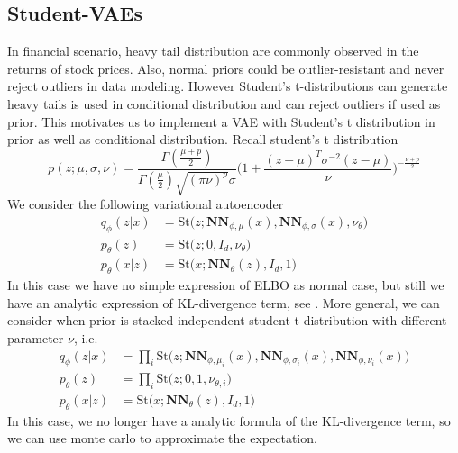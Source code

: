 \documentclass[12pt]{report}
\theoremstyle{definition}
\theoremstyle{remark}
\begin{document}
\subsection{Student-VAEs}
In financial scenario, heavy tail distribution are commonly observed in the returns of stock prices. Also, normal priors could be outlier-resistant and never reject outliers in data modeling. However Student’s t-distributions can generate heavy tails is used in conditional distribution and can reject outliers if used as prior. This motivates us to implement a VAE with Student’s t distribution in prior \cite{abiri2020variational} as well as conditional distribution. Recall student's t distribution 
\begin{equation}
  p(z;\mu,\sigma,\nu) = \frac{\Gamma(\frac{\mu + p}{2})}{\Gamma(\frac{\mu}{2})\sqrt{(\pi \nu)^{p}}\sigma}\bigg(1 + \frac{(z - \mu)^{T}\sigma^{-2}(z-\mu)}{\nu}\bigg)^{-\frac{\nu+p}{2}}
\end{equation}
We consider the following variational autoencoder 
  \begin{equation}
    \begin{split}
      q_{\phi}(z|x) &= \text{St}\Big(z;\mathbf{NN}_{\phi,\mu}(x),\mathbf{NN}_{\phi,\sigma}(x),\nu_{\theta}\Big)\\
      p_{\theta}(z) &= \text{St}\Big(z;0,I_{d},\nu_{\theta}\Big)\\
      p_{\theta}(x|z) &= \text{St}\Big(x;\mathbf{NN}_{\theta}(z),I_{d},1\Big)
    \end{split}
  \end{equation}
  In this case we have no simple expression of ELBO as normal case, but still we have an analytic expression of KL-divergence term, see \cite{abiri2019advantage}. More general, we can consider when prior is stacked independent student-t distribution with 
  different parameter $\nu$, i.e. 
  \begin{equation}
    \begin{split}
      q_{\phi}(z|x) &= \prod_{i}\text{St}\Big(z;\mathbf{NN}_{\phi,\mu_{i}}(x),\mathbf{NN}_{\phi,\sigma_{i}}(x),\mathbf{NN}_{\phi,\nu_{i}}(x)\Big)\\
      p_{\theta}(z) &= \prod_{i}\text{St}\Big(z;0,1,\nu_{\theta,i}\Big)\\
      p_{\theta}(x|z) &= \text{St}\Big(x;\mathbf{NN}_{\theta}(z),I_{d},1\Big)
    \end{split}
  \end{equation}
  In this case, we no longer have a analytic formula of the KL-divergence term, so we can use monte carlo to approximate the expectation.
\end{document}
